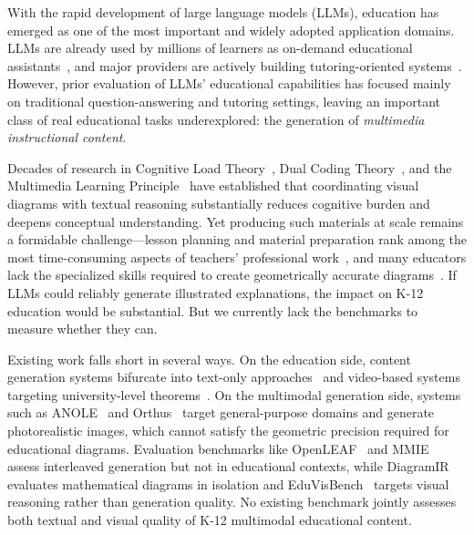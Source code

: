\documentclass[11pt]{article}
\begin{document}
With the rapid development of large language models (LLMs), education has emerged as one of the most important and widely adopted application domains. LLMs are already used by millions of learners as on-demand educational assistants~\citep{kamalov2025agentic}, and major providers are actively building tutoring-oriented systems~\citep{wang2025genmentor,liu2025cogent}. However, prior evaluation of LLMs' educational capabilities has focused mainly on traditional question-answering and tutoring settings, leaving an important class of real educational tasks underexplored: the generation of \textit{multimedia instructional content}.

Decades of research in Cognitive Load Theory~\citep{sweller1988cognitive}, Dual Coding Theory~\citep{paivio1971imagery}, and the Multimedia Learning Principle~\citep{mayer2001multimedia} have established that coordinating visual diagrams with textual reasoning substantially reduces cognitive burden and deepens conceptual understanding. Yet producing such materials at scale remains a formidable challenge---lesson planning and material preparation rank among the most time-consuming aspects of teachers' professional work~\citep{philipp2013teachers,thompson2024teachers}, and many educators lack the specialized skills required to create geometrically accurate diagrams~\citep{turkozudincer2025literacy,yao2026instructional}. If LLMs could reliably generate illustrated explanations, the impact on K-12 education would be substantial. But we currently lack the benchmarks to measure whether they can.

Existing work falls short in several ways. On the education side, content generation systems bifurcate into text-only approaches~\citep{liu2025cogent,wang2025genmentor} and video-based systems targeting university-level theorems~\citep{ku2025theoremexplain,chen2025code2video}. On the multimodal generation side, systems such as ANOLE~\citep{chern2024anole} and Orthus~\citep{kou2025orthus} target general-purpose domains and generate photorealistic images, which cannot satisfy the geometric precision required for educational diagrams. Evaluation benchmarks like OpenLEAF~\citep{an2024openleaf} and MMIE~\citep{xia2025mmie} assess interleaved generation but not in educational contexts, while DiagramIR~\citep{kumar2025diagramir} evaluates mathematical diagrams in isolation and EduVisBench~\citep{ji2025eduvis} targets visual reasoning rather than generation quality. No existing benchmark jointly assesses both textual and visual quality of K-12 multimodal educational content.
\end{document}

